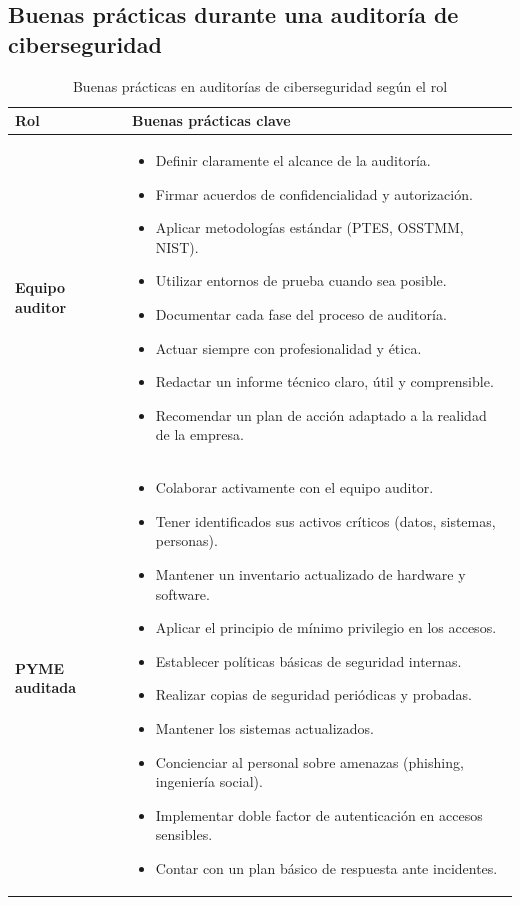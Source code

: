 \documentclass[a4paper, 10pt]{article}
\begin{document}
    
    \subsection{Buenas prácticas durante una auditoría de ciberseguridad}
    \begin{table}[H]
        \centering
        \caption{Buenas prácticas en auditorías de ciberseguridad según el rol}
        \begin{tabular}{|p{4cm}|p{11cm}|}
        \hline
        \rowcolor[HTML]{EFEFEF}
        \textbf{Rol} & \textbf{Buenas prácticas clave} \\
        \hline
        
        \textbf{Equipo auditor} & 
        \begin{itemize}
            \item Definir claramente el alcance de la auditoría.
            \item Firmar acuerdos de confidencialidad y autorización.
            \item Aplicar metodologías estándar (PTES, OSSTMM, NIST).
            \item Utilizar entornos de prueba cuando sea posible.
            \item Documentar cada fase del proceso de auditoría.
            \item Actuar siempre con profesionalidad y ética.
            \item Redactar un informe técnico claro, útil y comprensible.
            \item Recomendar un plan de acción adaptado a la realidad de la empresa.
        \end{itemize} \\
        \hline
        
        \textbf{PYME auditada} & 
        \begin{itemize}
            \item Colaborar activamente con el equipo auditor.
            \item Tener identificados sus activos críticos (datos, sistemas, personas).
            \item Mantener un inventario actualizado de hardware y software.
            \item Aplicar el principio de mínimo privilegio en los accesos.
            \item Establecer políticas básicas de seguridad internas.
            \item Realizar copias de seguridad periódicas y probadas.
            \item Mantener los sistemas actualizados.
            \item Concienciar al personal sobre amenazas (phishing, ingeniería social).
            \item Implementar doble factor de autenticación en accesos sensibles.
            \item Contar con un plan básico de respuesta ante incidentes.
        \end{itemize} \\
        \hline
        \end{tabular}
        \end{table}
        
\end{document}
